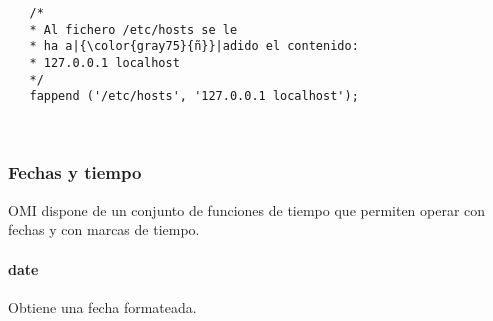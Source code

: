 \begin{lstlisting}  
   /*
   * Al fichero /etc/hosts se le
   * ha a|{\color{gray75}{ñ}}|adido el contenido:
   * 127.0.0.1 localhost
   */
   fappend ('/etc/hosts', '127.0.0.1 localhost');
\end{lstlisting}
\hfill\\ 

\subsubsection{Fechas y tiempo}
OMI dispone de un conjunto de funciones de tiempo que permiten operar con fechas y con marcas de tiempo. 

\paragraph{date}
Obtiene una fecha formateada.  


